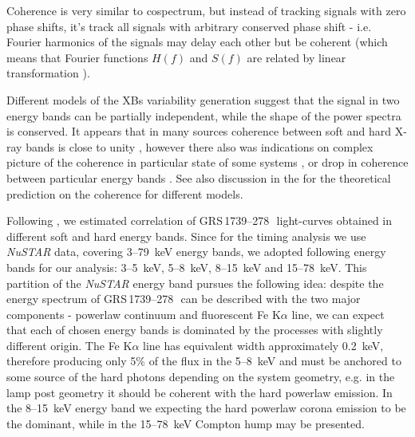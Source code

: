 \documentclass[a4paper,fleqn,usenatbib]{mnras}
\def\grs{{GRS\,1739--278\,}}
\begin{document}
Coherence is very similar to cospectrum, but instead of tracking signals with zero phase shifts, it's track all signals with arbitrary conserved phase shift - i.e. Fourier harmonics of the signals may delay each other but be coherent (which means that Fourier functions $H(f)$ and $S(f)$ are related by linear transformation \citep{1997ApJ...474L..43V}).

Different models of the XBs variability generation suggest that the signal in two energy bands can be partially independent, while the shape of the power spectra is conserved.
It appears that in many sources coherence between soft and hard X-ray bands is close to unity \citep{1999ApJ...517..355N, 1999ApJ...514..939W}, however there also was indications on complex picture of the coherence in particular state of some systems \citep{2003ApJ...584L..23J}, or drop in coherence between particular energy bands \citep[e.g. in GX 339--4][]{1997ApJ...474L..43V}.
See also discussion in the \citep{1997ApJ...474L..43V} for the theoretical prediction on the coherence for different models.


Following \citep{1997ApJ...474L..43V}, we estimated correlation of \grs\ light-curves obtained in different soft and hard energy bands. 
Since for the timing analysis we use {\it NuSTAR} data, covering 3--79~keV energy bands, we adopted following energy bands for our analysis: 3--5~keV, 5--8~keV, 8--15~keV and 15--78~keV.
This partition of the {\it NuSTAR} energy band pursues the following idea: despite the energy spectrum of \grs\ can be described with the two major components - powerlaw continuum and fluorescent Fe K$\alpha$ line, we can expect that each of chosen energy bands is dominated by the processes with slightly different origin. 
The Fe K$\alpha$ line has equivalent width approximately 0.2~keV, therefore producing only 5\% of the flux in the 5--8~keV and must be anchored to some source of the hard photons depending on the system geometry, e.g. in the lamp post geometry it should be coherent with the hard powerlaw emission. 
In the 8--15~keV energy band we expecting the hard powerlaw corona emission to be the dominant, while in the 15--78~keV Compton hump may be presented.
\end{document}

